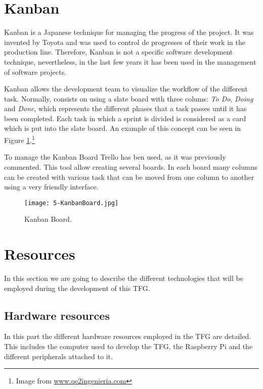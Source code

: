 \section{Kanban}

Kanban \cite{Gar11,KS10} is a Japanese technique for managing the progress of the project. It was invented by Toyota and was used to control de progresses of their work in the production line. Therefore, Kanban is not a specific software development technique, nevertheless, in the last few years it has been used in the management of software projects.

Kanban allows the development team to visualize the workflow of the different task. Normally, consists on using a slate board with three colums: \emph{To Do}, \emph{Doing} and \emph{Done}, which represents the different phases that a task passes until it has been completed. Each task in which a sprint is divided is considered as a card which is put into the slate board. An example of this concept can be seen in Figure \ref{fig:5-KanbanBoard}.\footnote{Image from \url{www.qe2ingenieria.com}}

To manage the Kanban Board Trello has ben used, as it was previously commented. This tool allow creating several boards. In each board many columns can be created with various task that can be moved from one column to another using a very friendly interface.

\begin{figure}[!h]
	\begin{center}
		\texttt{[image: 5-KanbanBoard.jpg]}
		\caption{Kanban Board.}
		\label{fig:5-KanbanBoard}
	\end{center}
\end{figure}







\section{Resources} %
In this section we are going to describe the different technologies that will be employed during the development of this \ac{TFG}.

\subsection{Hardware resources}
In this part the different hardware resources employed in the \ac{TFG} are detailed. This includes the computer used to develop the \ac{TFG}, the Raspberry Pi and the different peripherals attached to it.

